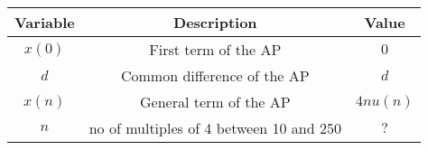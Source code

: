 \begin{tabular}[12.1pt]{ |c| c| c|}
    \hline
    \textbf{Variable} & \textbf{Description} &\textbf{Value}\\ 
    \hline
    $x(0)$ & First term of the AP & $0$ \\
    \hline 
    $d$ & Common difference of the AP &$d$ \\
    \hline 
    $x(n)$ & General term of the AP & $4nu(n)$\\
    \hline
   $n$ & no of multiples of 4 between 10 and 250 & $?$\\
   \hline
    \end{tabular}
